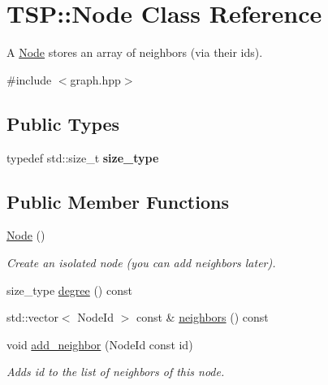 \hypertarget{classTSP_1_1Node}{}\section{T\+SP\+:\+:Node Class Reference}
\label{classTSP_1_1Node}


A {\ttfamily \hyperlink{classTSP_1_1Node}{Node}} stores an array of neighbors (via their ids).  




{\ttfamily \#include $<$graph.\+hpp$>$}

\subsection*{Public Types}
\begin{DoxyCompactItemize}
\item 
\mbox{\label{classTSP_1_1Node_a584e86cd92dca0c5a74531a829e8c916}} 
typedef std\+::size\+\_\+t {\bfseries size\+\_\+type}
\end{DoxyCompactItemize}
\subsection*{Public Member Functions}
\begin{DoxyCompactItemize}
\item 
\mbox{\label{classTSP_1_1Node_a2efe21dcdee3229f926ea26bceb2e2bd}} 
\hyperlink{classTSP_1_1Node_a2efe21dcdee3229f926ea26bceb2e2bd}{Node} ()
\begin{DoxyCompactList}\small\item\em Create an isolated node (you can add neighbors later). \end{DoxyCompactList}\item 
size\+\_\+type \hyperlink{classTSP_1_1Node_aaaa462cf10f30be7648f7611112ec879}{degree} () const
\item 
std\+::vector$<$ Node\+Id $>$ const  \& \hyperlink{classTSP_1_1Node_afcd0a49f62af612b09db62ea0ca14856}{neighbors} () const
\item 
void \hyperlink{classTSP_1_1Node_a80097c7c5b257124bd4ca93af1c93d54}{add\+\_\+neighbor} (Node\+Id const id)
\begin{DoxyCompactList}\small\item\em Adds {\ttfamily id} to the list of neighbors of this node. \end{DoxyCompactList}\end{DoxyCompactItemize}
